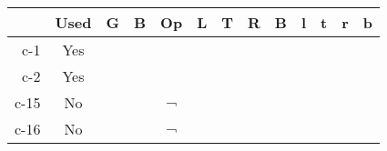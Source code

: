 \begin{tabular}[pos]{ | r | c | c | c | c | c | c | c | c | c | c | c | c | }
\hline
 & {\mktsStyleBold{}Used} & {\mktsStyleBold{}G} & {\mktsStyleBold{}B} & {\mktsStyleBold{}Op} & {\mktsStyleBold{}L} & {\mktsStyleBold{}T} & {\mktsStyleBold{}R} & {\mktsStyleBold{}B} & {\mktsStyleBold{}l} & {\mktsStyleBold{}t} & {\mktsStyleBold{}r} & {\mktsStyleBold{}b}\\

\hline
{\mktsStyleBold{}c-1} & Yes & \cjkgGlue{\cjk{}\cjkgGlue{\cnjzr{}}\cjkgGlue{}}\cjkgGlue{} & \cjkgGlue{\cjk{}\cjkgGlue{\cnjzr{}}\cjkgGlue{}}\cjkgGlue{} &  &  &  & \cjkgGlue{\cjk{}\cjkgGlue{\cnsym{}　}\cjkgGlue{}}\cjkgGlue{} & \cjkgGlue{\cjk{}\cjkgGlue{\cnsym{}　}\cjkgGlue{}}\cjkgGlue{} &  &  &  & \\
{\mktsStyleBold{}c-2} & Yes & \cjkgGlue{\cjk{}\cjkgGlue{\cnjzr{}}\cjkgGlue{}}\cjkgGlue{} & \cjkgGlue{\cjk{}\cjkgGlue{\cnjzr{}}\cjkgGlue{}}\cjkgGlue{} &  &  &  &  &  &  &  &  & \\
{\mktsStyleBold{}c-15} & No & \cjkgGlue{\cjk{}\cjkgGlue{\cnjzr{}}\cjkgGlue{}}\cjkgGlue{} & \cjkgGlue{\cjk{}\cjkgGlue{\cnjzr{}}\cjkgGlue{}}\cjkgGlue{} & ¬ & \cjkgGlue{\cjk{}\cjkgGlue{\cnjzr{}}\cjkgGlue{}}\cjkgGlue{} &  &  &  &  &  &  & \\
{\mktsStyleBold{}c-16} & No & \cjkgGlue{\cjk{}\cjkgGlue{\cnjzr{}}\cjkgGlue{}}\cjkgGlue{} & \cjkgGlue{\cjk{}\cjkgGlue{\cnjzr{}}\cjkgGlue{}}\cjkgGlue{} & ¬ &  & \cjkgGlue{\cjk{}\cjkgGlue{\cnjzr{}}\cjkgGlue{}}\cjkgGlue{} &  &  &  &  &  & \\
\hline
\end{tabular}



